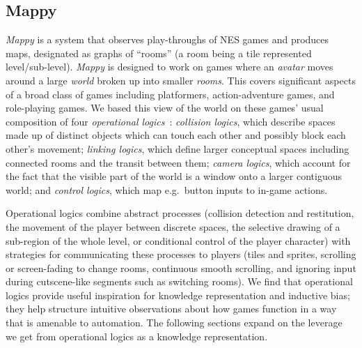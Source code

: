 \documentclass[12pt]{report}
\begin{document}
\subsection*{Mappy}


\emph{Mappy} is a system that observes play-throughs of NES games and produces maps, designated as graphs of ``rooms'' (a room being a tile represented level/sub-level).  \emph{Mappy} is designed to work on games where an \emph{avatar} moves around a large \emph{world} broken up into smaller \emph{rooms}.
This covers significant aspects of a broad class of games including platformers, action-adventure games, and role-playing games.
We based this view of the world on these games' usual composition of four \emph{operational logics}~\cite{wardrip-fruin2005playable,osborn2017refining}: \emph{collision logics}, which describe spaces made up of distinct objects which can touch each other and possibly block each other's movement; \emph{linking logics}, which define larger conceptual spaces including connected rooms and the transit between them; \emph{camera logics}, which account for the fact that the visible part of the world is a window onto a larger contiguous world; and \emph{control logics}, which map e.g.\ button inputs to in-game actions.

Operational logics combine abstract processes (collision detection and restitution, the movement of the player between discrete spaces, the selective drawing of a sub-region of the whole level, or conditional control of the player character) with strategies for communicating these processes to players (tiles and sprites, scrolling or screen-fading to change rooms, continuous smooth scrolling, and ignoring input during cutscene-like segments such as switching rooms).
We find that operational logics provide useful inspiration for knowledge representation and inductive bias; they help structure intuitive observations about how games function in a way that is amenable to automation.
The following sections expand on the leverage we get from operational logics as a knowledge representation.
\end{document}
